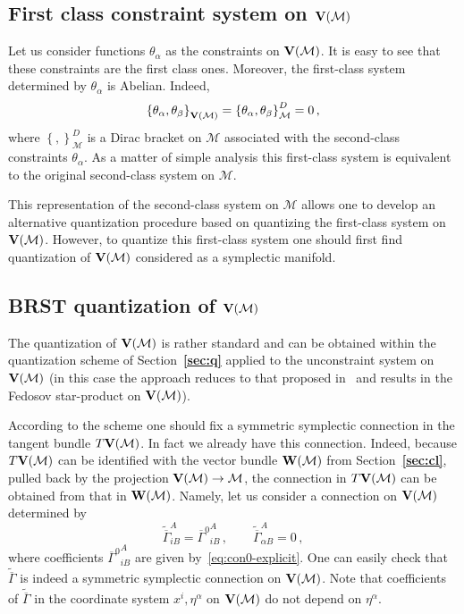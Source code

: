 \documentclass[a4paper,11pt]{amsart}
\numberwithin{thm}{section} %
\numberwithin{equation}{section} %
\numberwithin{figure}{section} %
\newcommand{\bref}[1]{{\bf \ref{#1}}}
\newcommand{\pb}[2]{\left\{{}#1{},{}#2{}\right\}}
\renewcommand{\:}{{\rm\, :\,}}
\def\bar{\overline}
\def\manM{{\mathcal M}}
\def\V{{\bf V}}
\def\W{{\bf W}}
\def\con{{\bar\Gamma}}
\def\conn{{\tilde\con}}
\def\D-con{\con^0}
\begin{document}
\subsection{First class constraint system on $\V(\manM)$}
Let us consider functions $\theta_\alpha$ as the constraints on
$\V(\manM)$.  It is easy to see that these constraints are the first
class ones.  Moreover, the first-class system determined by
$\theta_\alpha$ is Abelian. Indeed,
\begin{equation}
  \pb{\theta_\alpha}{\theta_\beta}_{\V(\manM)}=
  \pb{\theta_\alpha}{\theta_\beta}^D_{\manM}=0\,,
\end{equation}
where  $\pb{}{}^D_{\manM}$ is a Dirac bracket on $\manM$
associated with the second-class constraints $\theta_\alpha$.  As a
matter of simple analysis this first-class system is
equivalent to the original second-class system on $\manM$.

This representation of the second-class system on $\manM$
allows one to develop an alternative quantization procedure
based on quantizing the first-class system on $\V(\manM)$. However,
to quantize this first-class system one should first find quantization
of $\V(\manM)$ considered as a symplectic manifold.

\subsection{BRST quantization of $\V(\manM)$}\label{subsec:V-quant}
The quantization of $\V(\manM)$ is rather standard and can be obtained
within the quantization scheme of Section~\bref{sec:q} applied to the
unconstraint system on $\V(\manM)$ (in this case the approach
reduces to that proposed in~\cite{[GL]} and results in the Fedosov
star-product on $\V(\manM)$).

According to the scheme one should fix a symmetric symplectic
connection in the tangent bundle $T\V(\manM)$.  In fact we already
have this connection. Indeed, because $T\V(\manM)$ can be identified
with the vector bundle $\W(\manM)$ from Section~\bref{sec:cl}, pulled back by
the projection $\V(\manM) \to \manM$, the connection in $T\V(\manM)$ can be
obtained from that in $\W(\manM)$. Namely, let us consider a
connection on $\V(\manM)$ determined by
\begin{equation}
\label{eq:conn-explicit}
\conn^A_{iB}={\D-con}^A_{iB}\,, \qquad \conn^A_{\alpha B}=0\,,
\end{equation}
where coefficients ${\D-con}^A_{iB}$ are given
by~\eqref{eq:con0-explicit}.
One can easily check that $\conn$ is indeed a
symmetric symplectic connection on $\V(\manM)$.  Note that
coefficients of $\conn$ in the coordinate system $x^i,\eta^\alpha$ on
$\V(\manM)$ do not depend on $\eta^\alpha$.
\end{document}
